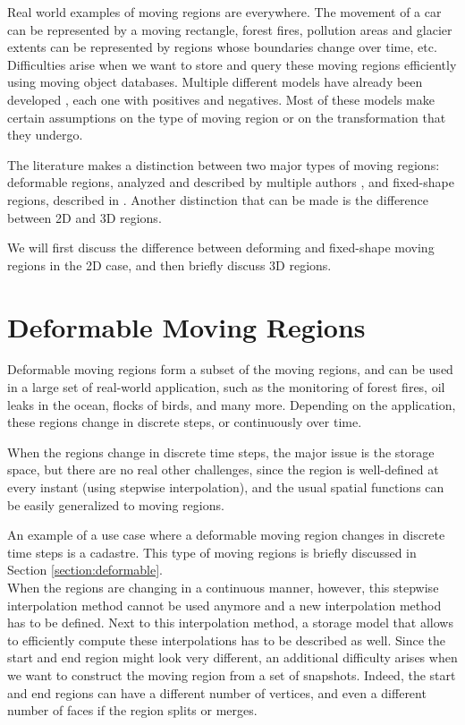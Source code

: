 
Real world examples of moving regions are everywhere. The movement of a car can be represented by a moving rectangle, forest fires, pollution areas and glacier extents can be represented by regions whose boundaries change over time, etc. Difficulties arise when we want to store and query these moving regions efficiently using moving object databases. Multiple different models have already been developed \cite{fmregion,polyhedra,model_structure_for_mod}, each one with positives and negatives. Most of these models make certain assumptions on the type of moving region or on the transformation that they undergo.

The literature makes a distinction between two major types of moving regions: deformable regions, analyzed and described by multiple authors \cite{polyhedra,model_structure_for_mod,moving_obj_foundation,}, and fixed-shape regions, described in \cite{fmregion}. Another distinction that can be made is the difference between 2D and 3D regions. 

We will first discuss the difference between deforming and fixed-shape moving regions in the 2D case, and then briefly discuss 3D regions.

\section{Deformable Moving Regions}
\label{section:deformable_regions}

Deformable moving regions form a subset of the moving regions, and can be used in a large set of real-world application, such as the monitoring of forest fires, oil leaks in the ocean, flocks of birds, and many more. Depending on the application, these regions change in discrete steps, or continuously over time. 

When the regions change in discrete time steps, the major issue is the storage space, but there are no real other challenges, since the region is well-defined at every instant (using stepwise interpolation), and the usual spatial functions can be easily generalized to moving regions.

An example of a use case where a deformable moving region changes in discrete time steps is a cadastre. This type of moving regions is briefly discussed in Section \ref{section:deformable}. \\

When the regions are changing in a continuous manner, however, this stepwise interpolation method cannot be used anymore and a new interpolation method has to be defined. Next to this interpolation method, a storage model that allows to efficiently compute these interpolations has to be described as well. Since the start and end region might look very different, an additional difficulty arises when we want to construct the moving region from a set of snapshots. Indeed, the start and end regions can have a different number of vertices, and even a different number of faces if the region splits or merges.

